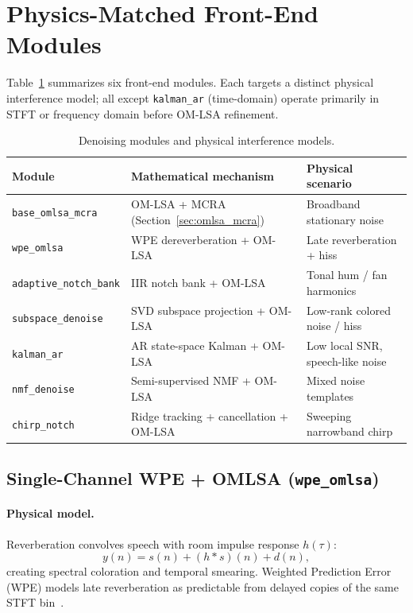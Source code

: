 \section{Physics-Matched Front-End Modules}
\label{sec:modules}

Table~\ref{tab:modules} summarizes six front-end modules. Each targets a distinct physical interference model; all except \texttt{kalman\_ar} (time-domain) operate primarily in STFT or frequency domain before OM-LSA refinement.

\begin{table}[H]
  \centering
  \caption{Denoising modules and physical interference models.}
  \label{tab:modules}
  \begin{tabularx}{\textwidth}{l X l}
    \toprule
    \textbf{Module} & \textbf{Mathematical mechanism} & \textbf{Physical scenario} \\
    \midrule
    \texttt{base\_omlsa\_mcra}     & OM-LSA + MCRA (Section~\ref{sec:omlsa_mcra}) & Broadband stationary noise \\
    \texttt{wpe\_omlsa}            & WPE dereverberation + OM-LSA & Late reverberation + hiss \\
    \texttt{adaptive\_notch\_bank} & IIR notch bank + OM-LSA & Tonal hum / fan harmonics \\
    \texttt{subspace\_denoise}     & SVD subspace projection + OM-LSA & Low-rank colored noise / hiss \\
    \texttt{kalman\_ar}            & AR state-space Kalman + OM-LSA & Low local SNR, speech-like noise \\
    \texttt{nmf\_denoise}          & Semi-supervised NMF + OM-LSA & Mixed noise templates \\
    \texttt{chirp\_notch}          & Ridge tracking + cancellation + OM-LSA & Sweeping narrowband chirp \\
    \bottomrule
  \end{tabularx}
\end{table}

\subsection{Single-Channel WPE + OMLSA (\texttt{wpe\_omlsa})}

\paragraph{Physical model.}
Reverberation convolves speech with room impulse response $h(\tau)$:
\begin{equation}
  y(n) = s(n) + (h * s)(n) + d(n),
\end{equation}
creating spectral coloration and temporal smearing. Weighted Prediction Error (WPE) models late reverberation as predictable from delayed copies of the same STFT bin~\cite{loizou2013}.


